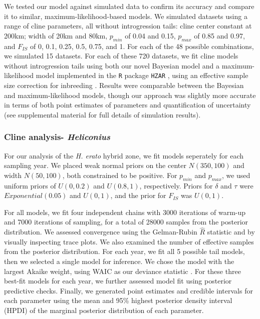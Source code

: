 \documentclass[]{article}
\begin{document}
We tested our model against simulated data to confirm its accuracy and
compare it to similar, maximum-likelihood-based models. We simulated
datasets using a range of cline parameters, all without introgression
tails: cline center constant at 200km; width of 20km and 80km,
\(p_{min}\) of 0.04 and 0.15, \(p_{max}\) of 0.85 and 0.97, and
\(F_{IS}\) of 0, 0.1, 0.25, 0.5, 0.75, and 1. For each of the 48
possible combinations, we simulated 15 datasets. For each of these 720
datasets, we fit cline models without introgression tails using both our
novel Bayesian model and a maximum-likelihood model implemented in the
\texttt{R} package \texttt{HZAR} \citep{Derryberry:2014jw}, using an
effective sample size correction for inbreeding
\citep{Alexandrino:2005vl}. Results were comparable between the Bayesian
and maximum-likelihood models, though our approach was slightly more
accurate in terms of both point estimates of parameters and
quantification of uncertainty (see supplemental material for full
details of simulation results).

\subsubsection{\texorpdfstring{Cline analysis-
\textit{Heliconius}}{Cline analysis- }}\label{cline-analysis-}

For our analysis of the \textit{H. erato} hybrid zone, we fit models
seperately for each sampling year. We placed weak normal priors on the
center \(N(350, 100)\) and width \(N(50, 100)\), both constrained to be
positive. For \(p_{min}\) and \(p_{max}\), we used uniform priors of
\(U(0,0.2)\) and \(U(0.8,1)\), respectively. Priors for \(\delta\) and
\(\tau\) were \(Exponential(0.05)\) and \(U(0,1)\), and the prior for
\(F_{IS}\) was \(U(0,1)\).

For all models, we fit four independent chains with 3000 iterations of
warm-up and 7000 iterations of sampling, for a total of 28000 samples
from the posterior distribution. We assessed convergence using the
Gelman-Rubin \(\hat{R}\) statistic \citep{Gelman:1992ts} and by visually
inspecting trace plots. We also examined the number of effective samples
from the posterior distribution. For each year, we fit all 5 possible
tail models, then we selected a single model for inference. We chose the
model with the largest Akaike weight, using WAIC as our deviance
statistic \citep{ Watanabe:2010uh,McElreath:2016wa}. For these three
best-fit models for each year, we further assessed model fit using
posterior predictive checks. Finally, we generated point estimates and
credible intervals for each parameter using the mean and 95\% highest
posterior density interval (HPDI) of the marginal posterior distribution
of each parameter.
\end{document}
